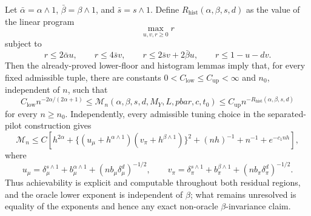 Let \(\bar\alpha=\alpha\wedge1\), \(\bar\beta=\beta\wedge1\), and \(\bar s=s\wedge1\). Define \(R_{\mathrm{hist}}(\alpha,\beta,s,d)\) as the value of the linear program
\[
\max_{u,v,r\ge0} r
\]
subject to
\[
r\le2\bar\alpha u,\qquad r\le4\bar s v,\qquad r\le2\bar s v+2\bar\beta u,\qquad r\le1-u-dv.
\]
Then the already-proved lower-floor and histogram lemmas imply that, for every fixed admissible tuple, there are constants \(0<C_{\mathrm{low}}\le C_{\mathrm{up}}<\infty\) and \(n_0\), independent of \(n\), such that
\[
C_{\mathrm{low}}n^{-2\alpha/(2\alpha+1)}
\le
\mathcal M_n(\alpha,\beta,s,d,M_Y,L,pbar,c,t_0)
\le
C_{\mathrm{up}}n^{-R_{\mathrm{hist}}(\alpha,\beta,s,d)}
\]
for every \(n\ge n_0\). Independently, every admissible tuning choice in the separated-pilot construction gives
\[
\mathcal M_n
\le C\left[h^{2\alpha}+\{(u_\mu+h^{\alpha\wedge1})(v_\pi+h^{\beta\wedge1})\}^2+(nh)^{-1}+n^{-1}+e^{-c_1nh}\right],
\]
where
\[
u_\mu=\delta_\mu^{s\wedge1}+b_\mu^{\alpha\wedge1}+(nb_\mu\delta_\mu^d)^{-1/2},\qquad
v_\pi=\delta_\pi^{s\wedge1}+b_\pi^{\beta\wedge1}+(nb_\pi\delta_\pi^d)^{-1/2}.
\]
Thus achievability is explicit and computable throughout both residual regions, and the oracle lower exponent is independent of \(\beta\); what remains unresolved is equality of the exponents and hence any exact non-oracle \(\beta\)-invariance claim.